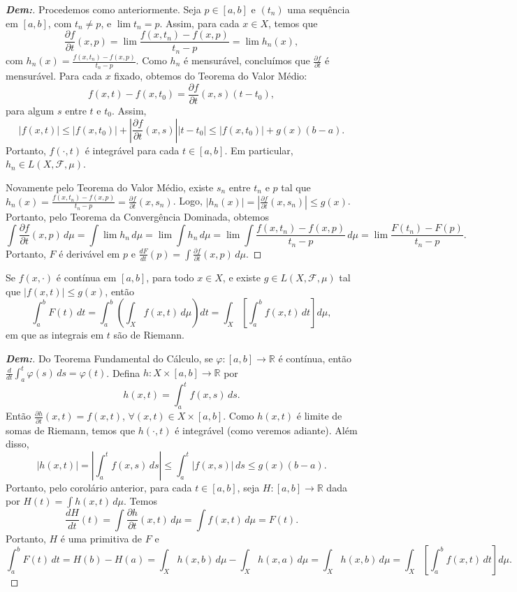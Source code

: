 \begin{proof}[\textbf{Dem:}]
Procedemos como anteriormente. Seja $p \in [a,b]$ e $(t_n)$ uma sequência em $[a,b]$, com $t_n \neq p$, e $\lim t_n = p$. Assim, para cada $x \in X$, temos que
$$ \frac{\partial f}{\partial t}(x,p) = \lim \frac{f(x,t_n) - f(x,p)}{t_n - p} = \lim h_n(x), $$
com $h_n(x) = \frac{f(x,t_n) - f(x,p)}{t_n - p}$. Como $h_n$ é mensurável, concluímos que $\frac{\partial f}{\partial t}$ é mensurável. Para cada $x$ fixado, obtemos do Teorema do Valor Médio:
$$ f(x,t) - f(x,t_0) = \frac{\partial f}{\partial t}(x,s)(t - t_0), $$
para algum $s$ entre $t$ e $t_0$. Assim,
$$ |f(x,t)| \le |f(x,t_0)| + \left| \frac{\partial f}{\partial t}(x,s) \right| |t - t_0| \le |f(x,t_0)| + g(x)(b-a). $$
Portanto, $f(\cdot, t)$ é integrável para cada $t \in [a,b]$. Em particular, $h_n \in L(X, \mathcal{F}, \mu)$. 

Novamente pelo Teorema do Valor Médio, existe $s_n$ entre $t_n$ e $p$ tal que $h_n(x) = \frac{f(x,t_n) - f(x,p)}{t_n - p} = \frac{\partial f}{\partial t}(x,s_n)$. Logo, $\left| h_n(x) \right| = \left| \frac{\partial f}{\partial t}(x,s_n) \right| \le g(x)$. Portanto, pelo Teorema da Convergência Dominada, obtemos
$$ \int \frac{\partial f}{\partial t}(x,p) \, d\mu = \int \lim h_n \, d\mu = \lim \int h_n \, d\mu = \lim \int \frac{f(x,t_n) - f(x,p)}{t_n - p} \, d\mu = \lim \frac{F(t_n) - F(p)}{t_n - p}. $$
Portanto, $F$ é derivável em $p$ e $\frac{dF}{dt}(p) = \int \frac{\partial f}{\partial t}(x,p) \, d\mu$.
\end{proof}

\begin{prop*}{}
Se $f(x, \cdot)$ é contínua em $[a,b]$, para todo $x \in X$, e existe $g \in L(X, \mathcal{F}, \mu)$ tal que $|f(x,t)| \le g(x)$, então
$$ \int_a^b F(t) \, dt = \int_a^b \left( \int_X f(x,t) \, d\mu \right) dt = \int_X \left[ \int_a^b f(x,t) \, dt \right] d\mu, $$
em que as integrais em $t$ são de Riemann.
\end{prop*}

\begin{proof}[\textbf{Dem:}]
Do Teorema Fundamental do Cálculo, se $\varphi: [a,b] \rightarrow \mathbb{R}$ é contínua, então $\frac{d}{dt} \int_a^t \varphi(s) \, ds = \varphi(t)$. Defina $h: X \times [a,b] \rightarrow \mathbb{R}$ por
$$ h(x,t) = \int_a^t f(x,s) \, ds. $$
Então $\frac{\partial h}{\partial t}(x,t) = f(x,t)$, $\forall (x,t) \in X \times [a,b]$. Como $h(x,t)$ é limite de somas de Riemann, temos que $h(\cdot, t)$ é integrável (como veremos adiante). Além disso,
$$ |h(x,t)| = \left| \int_a^t f(x,s) \, ds \right| \le \int_a^t |f(x,s)| \, ds \le g(x)(b-a). $$
Portanto, pelo corolário anterior, para cada $t \in [a,b]$, seja $H: [a,b] \rightarrow \mathbb{R}$ dada por $H(t) = \int h(x,t) \, d\mu$. Temos
$$ \frac{dH}{dt}(t) = \int \frac{\partial h}{\partial t}(x,t) \, d\mu = \int f(x,t) \, d\mu = F(t). $$
Portanto, $H$ é uma primitiva de $F$ e
$$ \int_a^b F(t) \, dt = H(b) - H(a) = \int_X h(x,b) \, d\mu - \int_X h(x,a) \, d\mu = \int_X h(x,b) \, d\mu = \int_X \left[ \int_a^b f(x,t) \, dt \right] d\mu. $$
\end{proof}

